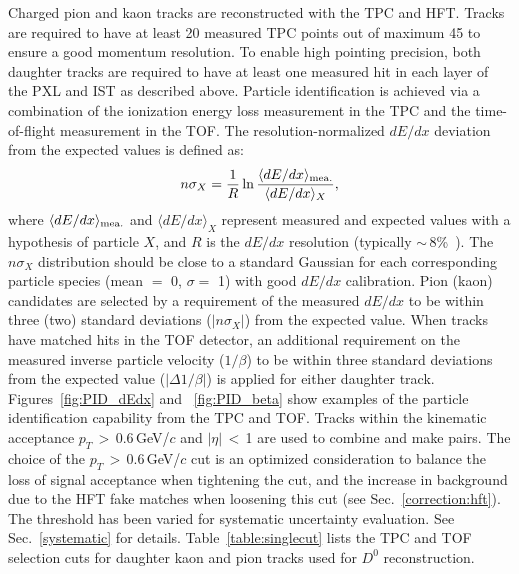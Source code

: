 \documentclass[%
 reprint,	
showpacs,
 amsmath,amssymb,
 aps,
 prc,
]{revtex4-1}
\providecommand{\DIFaddtex}[1]{{\protect\color{blue}\uwave{#1}}} %
\providecommand{\DIFdeltex}[1]{{\protect\color{red}\sout{#1}}}                      %
\providecommand{\DIFaddbegin}{} %
\providecommand{\DIFaddend}{} %
\providecommand{\DIFdelbegin}{} %
\providecommand{\DIFdelend}{} %
\providecommand{\DIFadd}[1]{\texorpdfstring{\DIFaddtex{#1}}{#1}} %
\providecommand{\DIFdel}[1]{\texorpdfstring{\DIFdeltex{#1}}{}} %
\begin{document}
Charged pion and kaon tracks are reconstructed with the TPC and HFT. Tracks are required to have at least 20 measured TPC points out of maximum 45 to ensure a good momentum resolution. To enable high pointing precision, both daughter tracks are required to have at least one measured hit in each layer of the PXL and IST as described above. Particle identification is achieved via a combination of the ionization energy loss measurement in the TPC and the time-of-flight measurement in the TOF. The resolution-normalized $dE/dx$ deviation from the expected values is defined as:
\begin{equation}
  n\sigma_X = \frac{1}{R}\ln\frac{\langle{dE/dx}\rangle_{\rm {mea.}}}{\langle{dE/dx}\rangle_{X}},
\label{equ:equation1}
\end{equation}
where $\langle{dE/dx}\rangle_{\rm {mea.}}$ and $\langle{dE/dx}\rangle_{X}$ represent measured and expected values with a hypothesis of particle $X$, and $R$ is the $dE/dx$ resolution (typically \DIFdelbegin \DIFdel{$\sim$}\DIFdelend \DIFaddbegin \DIFadd{$\approx$}\DIFaddend \,8\%~\cite{TPC}). The $n\sigma_X$ distribution should be close to a standard Gaussian for each corresponding particle species (mean $=$ 0, $\sigma = $ 1) with good $dE/dx$ calibration.
Pion (kaon) candidates are selected by a requirement of the measured $dE/dx$ to be within three (two) standard deviations ($|n\sigma_{X}|$) from the expected value. When tracks have matched hits in the TOF detector, an additional requirement on the measured inverse particle velocity ($1/\beta$) to be within three standard deviations from the expected value ($|\Delta 1/\beta|$) is applied for either daughter track. Figures~\ref{fig:PID_dEdx} and ~\ref{fig:PID_beta} show examples of the particle identification capability from the TPC and TOF. Tracks within the kinematic acceptance $p_{T}$\,$>$\,0.6\,GeV/$c$ and $|\eta|$\,$<$\,1 are used to combine and make pairs. The choice of the $p_T$\,$>$\,0.6\,GeV/$c$ cut is an optimized consideration to balance the loss of signal acceptance when tightening the cut, and the increase in background due to the HFT fake matches when loosening this cut (see Sec.~\ref{correction:hft}). The threshold has been varied for systematic uncertainty evaluation. See Sec.~\ref{systematic} for details. Table~\ref{table:singlecut} lists the TPC and TOF selection cuts for daughter kaon and pion tracks used for $D^0$ reconstruction.
\end{document}
